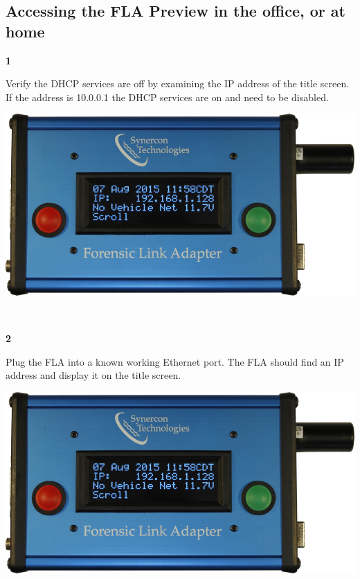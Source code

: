 \documentclass[11pt]{article}
\begin{document}
\subsection{Accessing the FLA Preview in the office, or at home}
\noindent\begin{minipage}{0.3\textwidth}%
\begin{center}
\textbf{1}\\[\baselineskip]
\end{center}
Verify the DHCP services are off by examining the IP address of the title screen. If the address is 10.0.0.1 the DHCP services are on and need to be disabled.
\end{minipage}%
\hfill%
\begin{minipage}{0.6\textwidth}
\includegraphics[width=\linewidth]{../media/fla_screens/ethernet_and_others/main/title_no_net}
\end{minipage}\\[\baselineskip]
\noindent\begin{minipage}{0.3\textwidth}%
\begin{center}
\textbf{2}\\[\baselineskip]
\end{center}
Plug the FLA into a known working Ethernet port. The FLA should find an IP address and display it on the title screen.
\end{minipage}%
\hfill%
\begin{minipage}{0.6\textwidth}
\includegraphics[width=\linewidth]{../media/fla_screens/ethernet_and_others/main/title_no_net}
\end{minipage}\\[\baselineskip]
\end{document}

